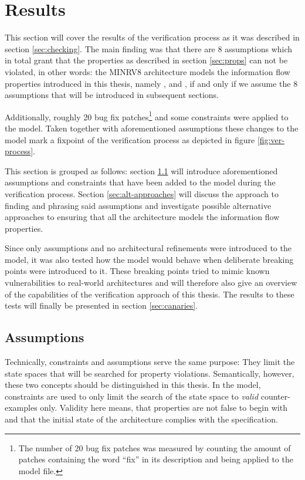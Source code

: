 
\section{Results}

This section will cover the results of the verification process as it was described in section \ref{sec:checking}.
The main finding was that there are 8 assumptions which in total grant that the properties as described in section \ref{sec:props} can not be violated, in other words: the MINRV8 architecture models the information flow properties introduced in this thesis, namely ,  and , if and only if we assume the 8 assumptions that will be introduced in subsequent sections.

Additionally, roughly 20 bug fix patches\footnote{%
    The number of 20 bug fix patches was measured by counting the amount of patches containing the word \enquote{fix} in its description and being applied to the model file.
} and some  constraints were applied to the model.
Taken together with aforementioned assumptions these changes to the model mark a fixpoint of the verification process as depicted in figure \ref{fig:ver-process}.

This section is grouped as follows: section \ref{sec:assumptions} will introduce aforementioned assumptions and  constraints that have been added to the model during the verification process.
Section \ref{sec:alt-approaches} will discuss the approach to finding and phrasing said assumptions and investigate possible alternative approaches to ensuring that all the architecture models the information flow properties.

Since only assumptions and no architectural refinements were introduced to the model, it was also tested how the model would behave when deliberate breaking points were introduced to it.
These breaking points tried to mimic known vulnerabilities to real-world architectures and will therefore also give an overview of the capabilities of the verification approach of this thesis.
The results to these tests will finally be presented in section \ref{sec:canaries}.

\subsection{Assumptions}
\label{sec:assumptions}

Technically,  constraints and assumptions serve the same purpose: They limit the state spaces that will be searched for property violations.
Semantically, however, these two concepts should be distinguished in this thesis.
In the model,  constraints are used to only limit the search of the state space to \textit{valid} counter-examples only.
Validity here means, that properties are not false to begin with and that the initial state of the architecture complies with the specification.

